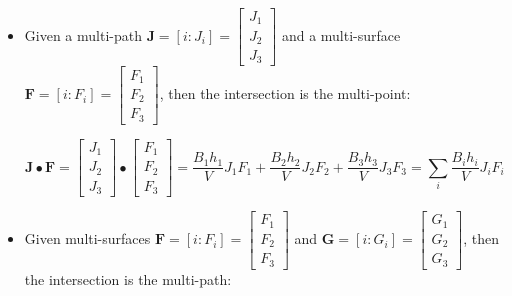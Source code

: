 \documentclass{book}
\begin{document}
\begin{itemize}
%


\item Given a multi-path \(\mathbf{J} = [i : J_i] = \begin{bmatrix} J_1 \\ J_2 \\ J_3 \end{bmatrix}\) and a multi-surface \(\mathbf{F} = [i : F_i] = \begin{bmatrix} F_1 \\ F_2 \\ F_3 \end{bmatrix}\), then the intersection is the multi-point:

\[\mathbf{J} \bullet \mathbf{F} = \begin{bmatrix} J_1 \\ J_2 \\ J_3 \end{bmatrix} \bullet \begin{bmatrix} F_1 \\ F_2 \\ F_3 \end{bmatrix} = \frac{B_1 h_1}{V} J_1 F_1 + \frac{B_2 h_2}{V} J_2 F_2 + \frac{B_3 h_3}{V} J_3 F_3 = \sum_i \frac{B_i h_i}{V} J_i F_i\]


%


\item Given multi-surfaces \(\mathbf{F} = [i : F_i] = \begin{bmatrix} F_1 \\ F_2 \\ F_3 \end{bmatrix}\) and \(\mathbf{G} = [i : G_i] = \begin{bmatrix} G_1 \\ G_2 \\ G_3 \end{bmatrix}\), then the intersection is the multi-path:


\end{itemize}
\end{document}
